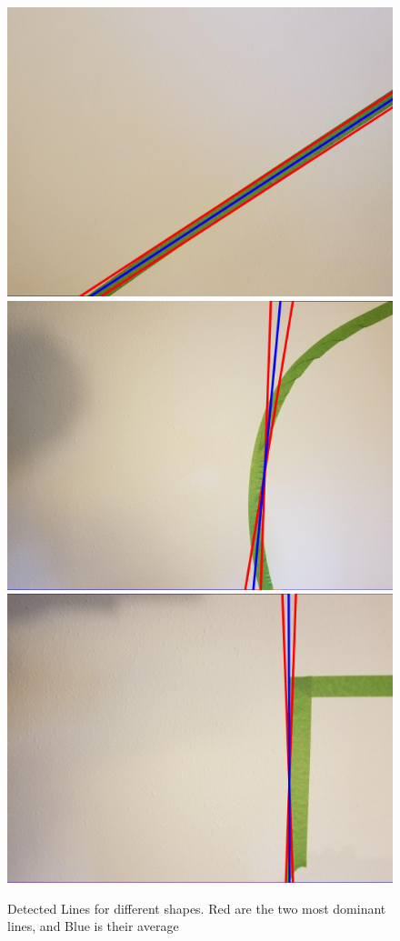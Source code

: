 \documentclass[10pt,twocolumn,letterpaper]{article}
\begin{document}
	\begin{figure}[!t] %
		\begin{center}
			\includegraphics[width=0.7\linewidth]{code/outputs/1_line}
			\includegraphics[width=0.7\linewidth]{code/outputs/10_line}
			\includegraphics[width=0.7\linewidth]{code/outputs/11_line}
		\end{center}
		\caption{Detected Lines for different shapes. Red are the two most dominant lines, and Blue is their average}
		\label{fig:detection}
	\end{figure}
	
\end{document}
